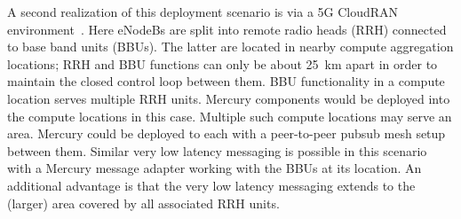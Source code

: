 A second realization of this deployment scenario is via a 5G CloudRAN
environment~\cite{checko2015cloud}. Here eNodeBs are split into remote radio
heads (RRH) connected to base band units (BBUs).  The latter are
located in nearby compute aggregation locations; RRH and BBU functions
can only be about 25~km apart in order to maintain the closed control
loop between them. BBU functionality in a compute location serves
multiple RRH units. Mercury components would be deployed into the
compute locations in this case.  Multiple such compute locations may
serve an area. Mercury could be deployed to each with a peer-to-peer
pubsub mesh setup between them.  Similar very low latency messaging is
possible in this scenario with a Mercury message adapter working with
the BBUs at its location.  An additional advantage is that the very
low latency messaging extends to the (larger) area covered by all
associated RRH units.
